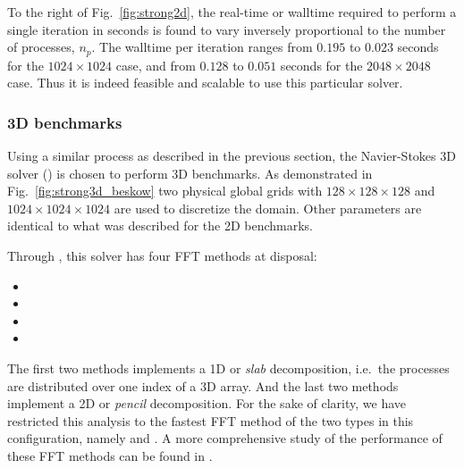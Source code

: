\documentclass{../jors}
\begin{document}
To the right of Fig.~\ref{fig:strong2d}, the real-time or walltime required to
perform a single iteration in seconds is found to vary inversely proportional
to the number of processes, $n_p$. The walltime per iteration ranges from
$0.195$ to $0.023$ seconds for the $1024\times1024$ case, and from
$0.128$ to $0.051$ seconds for the $2048\times2048$ case. Thus it is indeed
feasible and scalable to use this particular solver.

\subsubsection*{3D benchmarks}

Using a similar process as described in the previous section,
the Navier-Stokes 3D solver () is chosen to
perform 3D benchmarks.
%
As demonstrated in Fig.~\ref{fig:strong3d_beskow} two physical global grids
with $128\times128\times128$ and $1024\times1024\times1024$ are used to
discretize the domain.
%
Other parameters are identical to what was described for the 2D benchmarks.

Through , this solver has four FFT methods at disposal:

\begin{itemize}
 \item {}
 \item {}
 \item {}
 \item {}
\end{itemize}

The first two methods implements a 1D or \emph{slab} decomposition, i.e.\ the
processes are distributed over one index of a 3D array. And the last two
methods implement a 2D or \emph{pencil} decomposition. For the sake of clarity,
we have restricted this analysis to the fastest FFT method of the two types in
this configuration, namely  and
. A more comprehensive study of the
performance of these FFT methods can be found in \citet{fluidfft}.
\end{document}
